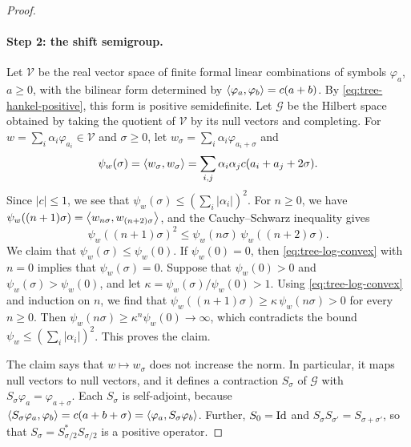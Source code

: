 \begin{proof}
\paragraph{Step 2: the shift semigroup.}
Let $\mathcal V$ be the real vector space of finite formal linear combinations of symbols $\varphi_a$, $a\ge0$, with the bilinear form determined by $\left\langle\varphi_a,\varphi_b\right\rangle=c(a+b)$. By \eqref{eq:tree-hankel-positive}, this form is positive semidefinite. Let $\mathcal G$ be the Hilbert space obtained by taking the quotient of $\mathcal V$ by its null vectors and completing. For $w=\sum_i\alpha_i\varphi_{a_i}\in\mathcal V$ and $\sigma\ge0$, let $w_\sigma=\sum_i\alpha_i\varphi_{a_i+\sigma}$ and
\[
 \psi_w(\sigma)=\left\langle w_\sigma,w_\sigma\right\rangle=\sum_{i,j}\alpha_i\alpha_jc(a_i+a_j+2\sigma).
\]
Since $|c|\le1$, we see that $\psi_w(\sigma)\le(\sum_i|\alpha_i|)^2$. For $n\ge0$, we have $\psi_w((n+1)\sigma)=\left\langle w_{n\sigma},w_{(n+2)\sigma}\right\rangle$, and the Cauchy--Schwarz inequality gives
\begin{equation}\label{eq:tree-log-convex}
 \psi_w((n+1)\sigma)^2\le\psi_w(n\sigma)\,\psi_w((n+2)\sigma).
\end{equation}
We claim that $\psi_w(\sigma)\le\psi_w(0)$. If $\psi_w(0)=0$, then \eqref{eq:tree-log-convex} with $n=0$ implies that $\psi_w(\sigma)=0$. Suppose that $\psi_w(0)>0$ and $\psi_w(\sigma)>\psi_w(0)$, and let $\kappa=\psi_w(\sigma)/\psi_w(0)>1$. Using \eqref{eq:tree-log-convex} and induction on $n$, we find that $\psi_w((n+1)\sigma)\ge\kappa\,\psi_w(n\sigma)>0$ for every $n\ge0$. Then $\psi_w(n\sigma)\ge\kappa^n\psi_w(0)\to\infty$, which contradicts the bound $\psi_w\le(\sum_i|\alpha_i|)^2$. This proves the claim.

The claim says that $w\mapsto w_\sigma$ does not increase the norm. In particular, it maps null vectors to null vectors, and it defines a contraction $S_\sigma$ of $\mathcal G$ with $S_\sigma\varphi_a=\varphi_{a+\sigma}$. Each $S_\sigma$ is self-adjoint, because $\left\langle S_\sigma\varphi_a,\varphi_b\right\rangle=c(a+b+\sigma)=\left\langle\varphi_a,S_\sigma\varphi_b\right\rangle$. Further, $S_0=\operatorname{Id}$ and $S_\sigma S_{\sigma'}=S_{\sigma+\sigma'}$, so that $S_\sigma=S_{\sigma/2}^*S_{\sigma/2}$ is a positive operator.


\end{proof}
